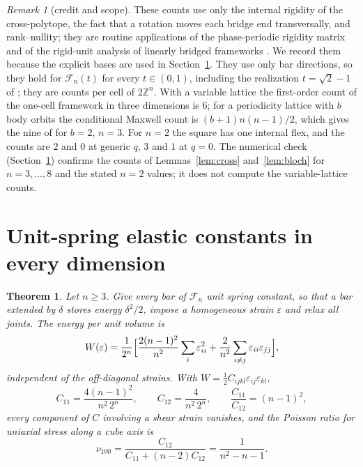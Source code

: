 \documentclass[11pt]{amsart}
\newtheorem{theorem}{Theorem}
\theoremstyle{definition}
\theoremstyle{remark}
\newtheorem{remark}{Remark}
\newcommand{\Z}{\mathbb{Z}}
\newcommand{\nus}{\nu_{100}}
\begin{document}
\begin{remark}[credit and scope]
These counts use only the internal rigidity of the cross-polytope, the fact that a rotation moves each bridge end transversally, and rank--nullity; they are routine applications of the phase-periodic rigidity matrix \cite{Power2014} and of the rigid-unit analysis of linearly bridged frameworks \cite{Goodwin2006}. We record them because the explicit bases are used in Section~\ref{sec:elastic}. They use only bar directions, so they hold for $\mathcal F_n(t)$ for every $t\in(0,1)$, including the realization $t=\sqrt2-1$ of \cite[Section~7]{BorceaStreinu2021}; they are counts per cell of $2\Z^n$. With a variable lattice the first-order count of the one-cell framework in three dimensions is $6$; for a periodicity lattice with $b$ body orbits the conditional Maxwell count is $(b+1)n(n-1)/2$, which gives the nine of \cite{BorceaStreinu2021} for $b=2$, $n=3$. For $n=2$ the square has one internal flex, and the counts are $2$ and $0$ at generic $q$, $3$ and $1$ at $q=0$. The numerical check (Section~\ref{sec:elastic}) confirms the counts of Lemmas~\ref{lem:cross} and~\ref{lem:bloch} for $n=3,\dots,8$ and the stated $n=2$ values; it does not compute the variable-lattice counts.
\end{remark}

\section{Unit-spring elastic constants in every dimension}\label{sec:elastic}

\begin{theorem}\label{thm:elastic}
Let $n\ge3$. Give every bar of $\mathcal F_n$ unit spring constant, so that a bar extended by $\delta$ stores energy $\delta^2/2$, impose a homogeneous strain $\varepsilon$ and relax all joints. The energy per unit volume is
\begin{equation}\label{eq:W}
W(\varepsilon)=\frac{1}{2^{n}}\Bigl[\frac{2(n-1)^2}{n^2}\sum_i\varepsilon_{ii}^2+\frac{2}{n^2}\sum_{i\ne j}\varepsilon_{ii}\varepsilon_{jj}\Bigr],
\end{equation}
independent of the off-diagonal strains. With $W=\tfrac12 C_{ijkl}\varepsilon_{ij}\varepsilon_{kl}$,
\[
C_{11}=\frac{4(n-1)^2}{n^2\,2^n},\qquad C_{12}=\frac{4}{n^2\,2^n},\qquad \frac{C_{11}}{C_{12}}=(n-1)^2,
\]
every component of $C$ involving a shear strain vanishes, and the Poisson ratio for uniaxial stress along a cube axis is
\[
\nus=\frac{C_{12}}{C_{11}+(n-2)C_{12}}=\frac{1}{n^2-n-1}.
\]
\end{theorem}
\end{document}
